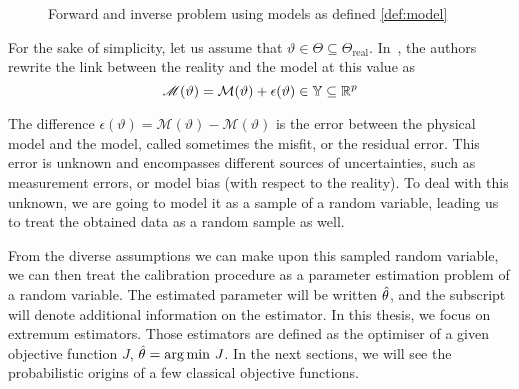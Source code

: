 \documentclass[../../Main_ManuscritThese.tex]{subfiles}
\newcommand\imgpath{/home/victor/acadwriting/Manuscrit/Text/Chapter2/img/}
\begin{document}
\begin{figure}[ht]
  \centering
  
  \caption{Forward and inverse problem using models as defined \cref{def:model}}
  \label{fig:inv_problem}
\end{figure}

% 

For the sake of simplicity, let us assume that $\vartheta \in \Theta \subseteq \Theta_{\mathrm{real}}$. In~\cite{kennedy_bayesian_2001,higdon_combining_2004}, the authors rewrite the link between the reality and the model at this value as 
\begin{equation}
  \label{eq:vartheta_models}
    \mathscr{M}(\vartheta) = %
    \mathcal{M}(\vartheta) + \epsilon(\vartheta) \in \Yspace \subseteq \mathbb{R}^p
  \end{equation}
 
  The difference
  $\epsilon(\vartheta) = \mathscr{M}(\vartheta) -
  \mathcal{M}(\vartheta)$ is the error between the physical model and
  the model, called sometimes the misfit, or the residual error.  This
  error is unknown and encompasses different sources of uncertainties,
  such as measurement errors, or model bias (with respect to the
  reality). To deal with this unknown, we are going to model it as a
  sample of a random variable, leading us to treat the obtained data
  as a random sample as well.

  From the diverse assumptions we can make upon this sampled random
  variable, we can then treat the calibration procedure as a parameter
  estimation problem of a random variable.  The estimated parameter
  will be written $\hat{\theta}$, and the subscript will denote
  additional information on the estimator.  In this thesis, we focus
  on extremum estimators. Those estimators are defined as the
  optimiser of a given objective function $J$,
  $\hat{\theta} = \operatorname*{arg\,min \,} J$. In the next sections, we will see the
  probabilistic origins of a few classical objective functions.
\end{document}

